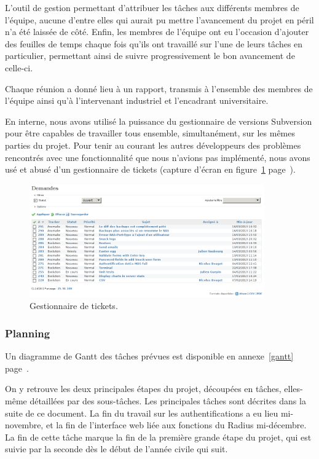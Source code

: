 L'outil de gestion permettant d'attribuer les tâches aux différents membres de l'équipe, aucune d'entre elles qui aurait pu mettre l'avancement du projet en péril n'a été laissée de côté. Enfin, les membres de l'équipe ont eu l'occasion d'ajouter des feuilles de temps chaque fois qu'ils ont travaillé sur l'une de leurs tâches en particulier, permettant ainsi de suivre progressivement le bon avancement de celle-ci.

Chaque réunion a donné lieu à un rapport, transmis à l'ensemble des membres de l'équipe ainsi qu'à l'intervenant industriel et l'encadrant universitaire.

En interne, nous avons utilisé la puissance du gestionnaire de versions Subversion pour être capables de travailler tous ensemble, simultanément, sur les mêmes parties du projet. Pour tenir au courant les autres développeurs des problèmes rencontrés avec une fonctionnalité que nous n'avions pas implémenté, nous avons usé et abusé d'un gestionnaire de tickets (capture d'écran en figure~\ref{tickets} page~\pageref{tickets}).

\begin{figure}[!h]
	\begin{center}
	    \includegraphics[width=0.9\textwidth]{img/tickets.png}
	\end{center}
	\caption{Gestionnaire de tickets.}
	\label{tickets}
\end{figure}

\subsubsection{Planning}

Un diagramme de Gantt des tâches prévues est disponible en annexe~\ref{gantt} page~\pageref{gantt}.

On y retrouve les deux principales étapes du projet, découpées en tâches, elles-même détaillées par des sous-tâches. Les principales tâches sont décrites dans la suite de ce document. La fin du travail sur les authentifications a eu lieu mi-novembre, et la fin de l'interface web liée aux fonctions du Radius mi-décembre. La fin de cette tâche marque la fin de la première grande étape du projet, qui est suivie par la seconde dès le début de l'année civile qui suit.

